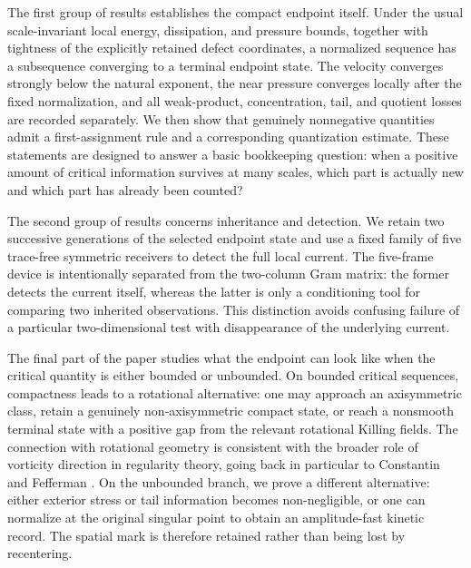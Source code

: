 \documentclass[11pt]{article}
\theoremstyle{definition}\newtheorem{problem}[theorem]{Problem}
\theoremstyle{definition}
\theoremstyle{remark}
\begin{document}
The first group of results establishes the compact endpoint itself.  Under the
usual scale-invariant local energy, dissipation, and pressure bounds, together
with tightness of the explicitly retained defect coordinates, a normalized
sequence has a subsequence converging to a terminal endpoint state.  The
velocity converges strongly below the natural exponent, the near pressure
converges locally after the fixed normalization, and all weak-product,
concentration, tail, and quotient losses are recorded separately.  We then
show that genuinely nonnegative quantities admit a first-assignment rule and a
corresponding quantization estimate.  These statements are designed to answer
a basic bookkeeping question: when a positive amount of critical information
survives at many scales, which part is actually new and which part has already
been counted?

The second group of results concerns inheritance and detection.  We retain two
successive generations of the selected endpoint state and use a fixed family of
five trace-free symmetric receivers to detect the full local current.  The
five-frame device is intentionally separated from the two-column Gram matrix:
the former detects the current itself, whereas the latter is only a conditioning
tool for comparing two inherited observations.  This distinction avoids
confusing failure of a particular two-dimensional test with disappearance of
the underlying current.

The final part of the paper studies what the endpoint can look like when the
critical quantity is either bounded or unbounded.  On bounded critical
sequences, compactness leads to a rotational alternative: one may approach an
axisymmetric class, retain a genuinely non-axisymmetric compact state, or reach
a nonsmooth terminal state with a positive gap from the relevant rotational
Killing fields.  The connection with rotational geometry is consistent with
the broader role of vorticity direction in regularity theory, going back in
particular to Constantin and Fefferman \cite{ConstantinFefferman1993}.  On the
unbounded branch, we prove a different alternative: either exterior stress or
tail information becomes non-negligible, or one can normalize at the original
singular point to obtain an amplitude-fast kinetic record.  The spatial mark is
therefore retained rather than being lost by recentering.
\end{document}
